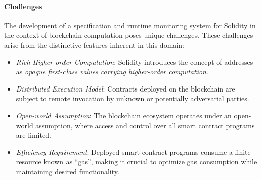 








\paragraph{Challenges}
The development of a specification and runtime monitoring system for Solidity in the context of blockchain computation poses unique challenges.
These challenges arise from the distinctive features inherent in this domain:


\begin{itemize}
  \item \textit{Rich Higher-order Computation}:
    Solidity introduces the concept of addresses as \emph{opaque first-class values carrying higher-order computation}. 
  \item \textit{Distributed Execution Model}:
    Contracts deployed on the blockchain are subject to remote invocation by unknown or potentially adversarial parties. 
  \item \textit{Open-world Assumption}:
    The blockchain ecosystem operates under an open-world assumption, where access and control over all smart contract programs are limited. 
  \item \textit{Efficiency Requirement}:
    Deployed smart contract programs consume a finite resource known as ``gas'', making it crucial to optimize gas consumption while maintaining desired functionality. 
\end{itemize}

